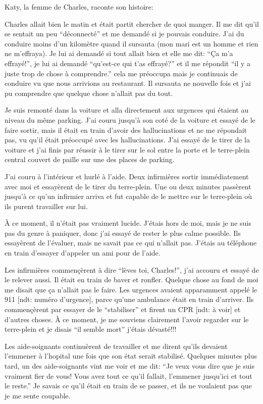 Katy, la femme de Charles, raconte son histoire:

Charles allait bien le matin et était partit chercher de quoi manger. Il me dit
qu'il se sentait un peu “déconnecté” et me demandé si je pouvais conduire. J'ai
du conduire moins d'un kilomètre quand il sursauta (mon mari est un homme et
rien ne m'effraya). Je lui ai demandé si tout allait bien et elle me dit: “Ça
m'a effrayé!”, je lui ai demandé “qu'est-ce qui t'as effrayé?” et il me répondit
“il y a juste trop de chose à comprendre.” cela me préoccupa mais je continuais
de conduire vu que nous arrivions au restaurant. Il sursauta ne nouvelle fois et
j'ai pu comprendre que quelque chose n'allait pas du tout.

Je suis remonté dans la voiture et alla directement aux urgences qui étaient au
niveau du même parking. J'ai couru jusqu'à son coté de la voiture et essayé de
le faire sortir, mais il était en train d'avoir des hallucinations et ne me
répondait pas, vu qu'il était préoccupé avec les hallucinations. J'ai essayé de
le tirer de la voiture et j'ai finis par réussir à le tirer sur le sol entre la
porte et le terre-plein central couvert de paille sur une des places de parking.

J'ai couru à l'intérieur et hurlé à l'aide. Deux infirmières sortir
immédiatement avec moi et essayèrent de le tirer du terre-plein. Une ou deux
minutes passèrent jusqu'à ce qu'un infirmier arriva et fut capable de le mettre
sur le terre-plein où ils purent travailler sur lui.

À ce moment, il n'était pas vraiment lucide. J'étais hors de moi, mais je ne
suis pas du genre à paniquer, donc j'ai essayé de rester le plus calme
possible. Ils essayèrent de l'évaluer, mais ne savait pas ce qui n'allait
pas. J'étais au téléphone en train d'essayer d'appeler un ami pour de l'aide.

Les infirmières commençèrent à dire “lèves toi, Charles!”, j'ai accouru et
essayé de le relever aussi. Il était en train de baver et ronfler. Quelque chose
au fond de moi me disait que ça n'allait pas le faire. Les urgences avaient
apparamment appelé le 911 [ndt: numéro d'urgence], parce qu'une ambulance était
en train d'arriver. Ils commençèrent par essayer de le “stabiliser” et firent un
CPR [ndt: à voir] et d'autres choses. À ce moment, je me souviens clairement
l'avoir regarder sur le terre-plein et je disais “il semble mort” j'étais
dévasté!!!

Les aide-soignants continuèrent de travailler et me dirent qu'ils devaient
l'emmener à l'hopital une fois que son état serait stabilisé. Quelques minutes
plus tard, un des aide-soignants vint me voir et me dit: “Je veux vous dire que
je suis vraiment fier de vous! Vous avez tout ce qu'il fallait, l'emmener
jusqu'ici et tout le reste.” Je savais ce qu'il était en train de se passer, et
ils ne voulaient pas que je me sente coupable.

